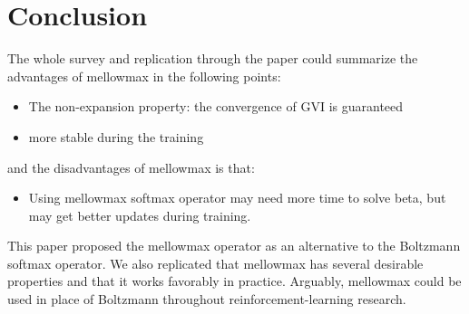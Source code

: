 \section{Conclusion}
\label{section:conclusion}
The whole survey and replication through the paper could summarize the advantages of mellowmax in the following points:
\begin{itemize}
\item The non-expansion property: the convergence of GVI is guaranteed
\item more stable during the training
\end{itemize}
and the disadvantages of mellowmax is that:
\begin{itemize}
\item Using mellowmax softmax operator may need more time to solve beta, but may get better updates during training.
\end{itemize}
This paper proposed the mellowmax operator as an alternative to the Boltzmann softmax operator. We also replicated that mellowmax has several desirable properties and that it works favorably in practice. Arguably, mellowmax could be used in place of Boltzmann throughout reinforcement-learning research.